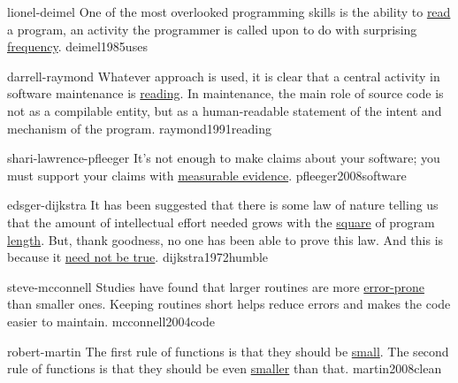 \documentclass{article}
\begin{document}

\qte
  {lionel-deimel}
  {One of the most overlooked programming skills is the ability to \ul{read} a program, an activity the programmer is called upon to do with surprising \ul{frequency}.}
  {deimel1985uses}

\qte
  {darrell-raymond}
  {Whatever approach is used, it is clear that a central activity in software maintenance is \ul{reading}. In maintenance, the main role of source code is not as a compilable entity, but as a human-readable statement of the intent and mechanism of the program.}
  {raymond1991reading}

\qte
  {shari-lawrence-pfleeger}
  {It's not enough to make claims about your software; you must support your claims with \ul{measurable evidence}.}
  {pfleeger2008software}




\qte
  {edsger-dijkstra}
  {It has been suggested that there is some law of nature telling us that the amount of intellectual effort needed grows with the \ul{square} of program \ul{length}. But, thank goodness, no one has been able to prove this law. And this is because it \ul{need not be true}.}
  {dijkstra1972humble}

\qte
  {steve-mcconnell}
  {Studies have found that larger routines are more \ul{error-prone} than smaller ones. Keeping routines short helps reduce errors and makes the code easier to maintain.}
  {mcconnell2004code}

\qte
  {robert-martin}
  {The first rule of functions is that they should be \ul{small}. The second rule of functions is that they should be even \ul{smaller} than that.}
  {martin2008clean}



\end{document}
